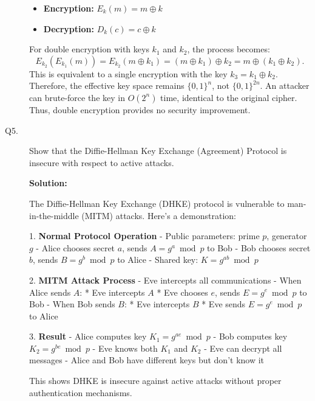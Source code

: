 \documentclass[11pt,epsfig]{article}
\begin{document}
\begin{description}
\begin{itemize}
    \item \textbf{Encryption:} \(E_k(m) = m \oplus k\)
    \item \textbf{Decryption:} \(D_k(c) = c \oplus k\)
\end{itemize}

For double encryption with keys \(k_1\) and \(k_2\), the process becomes:
\[
E_{k_2}(E_{k_1}(m)) = E_{k_2}(m \oplus k_1) = (m \oplus k_1) \oplus k_2 = m \oplus (k_1 \oplus k_2).
\]
This is equivalent to a single encryption with the key \(k_3 = k_1 \oplus k_2\). Therefore, the effective key space remains \(\{0,1\}^n\), not \(\{0,1\}^{2n}\). An attacker can brute-force the key in \(O(2^n)\) time, identical to the original cipher. Thus, double encryption provides no security improvement.



\item[Q5.] 
Show that the Diffie-Hellman Key Exchange (Agreement) Protocol is insecure with respect to active attacks.    \hfill {}

\textbf{Solution:}

The Diffie-Hellman Key Exchange (DHKE) protocol is vulnerable to man-in-the-middle (MITM) attacks. Here's a demonstration:

1. \textbf{Normal Protocol Operation}
    - Public parameters: prime $p$, generator $g$
    - Alice chooses secret $a$, sends $A = g^a \bmod p$ to Bob
    - Bob chooses secret $b$, sends $B = g^b \bmod p$ to Alice
    - Shared key: $K = g^{ab} \bmod p$

2. \textbf{MITM Attack Process}
    - Eve intercepts all communications
    - When Alice sends $A$:
      * Eve intercepts $A$
      * Eve chooses $e$, sends $E = g^e \bmod p$ to Bob
    - When Bob sends $B$:
      * Eve intercepts $B$
      * Eve sends $E = g^e \bmod p$ to Alice

3. \textbf{Result}
    - Alice computes key $K_1 = g^{ae} \bmod p$
    - Bob computes key $K_2 = g^{be} \bmod p$
    - Eve knows both $K_1$ and $K_2$
    - Eve can decrypt all messages
    - Alice and Bob have different keys but don't know it

This shows DHKE is insecure against active attacks without proper authentication mechanisms.



\end{description} 
\end{document}
